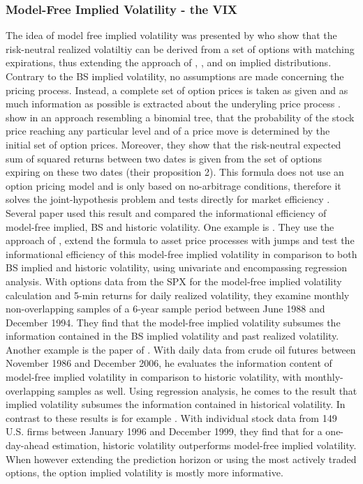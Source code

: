 \subsubsection{Model-Free Implied Volatility - the VIX}\label{sec:223VIX}
The idea of model free implied volatility was presented by \textcite{britten2000} who show that the risk-neutral realized volatiltiy can be derived from a set of options with matching expirations, thus extending the approach of \textcite{derman1994}, \textcite{dupire1994}, \textcite{dupire1997} and \textcite{rubinstein1994} on implied distributions. Contrary to the \ac{BS} implied volatility, no assumptions are made concerning the pricing process. Instead, a complete set of option prices is taken as given and as much information as possible is extracted about the underyling price process \parencite{britten2000}. \\
\textcite{britten2000} show in an approach resembling a binomial tree, that the probability of the stock price reaching any particular level and of a price move is determined by the initial set of option prices. Moreover, they show that the risk-neutral expected sum of squared returns between two dates is given from the set of options expiring on these two dates (their proposition 2). This formula does not use an option pricing model and is only based on no-arbitrage conditions, therefore it solves the joint-hypothesis problem and tests directly for market efficiency \parencite{jiang2003}. \\
Several paper used this result and compared the informational efficiency of model-free implied, \ac{BS} and historic volatility. One example is \textcite{jiang2003}. They use the approach of \textcite{britten2000}, extend the formula to asset price processes with jumps and test the informational efficiency of this model-free implied volatility in comparison to both \ac{BS} implied and historic volatility, using univariate and encompassing regression analysis. With options data from the \ac{SPX} for the model-free implied volatility calculation and 5-min returns for daily realized volatility, they examine monthly non-overlapping samples of a 6-year sample period between June 1988 and December 1994. They find that the model-free implied volatility subsumes the information contained in the \ac{BS} implied volatility and past realized volatility. Another example is the paper of \textcite{bakanova2010}. With daily data from crude oil futures between November 1986 and December 2006, he evaluates the information content of model-free implied volatility in comparison to historic volatility, with monthly-overlapping samples as well. Using regression analysis, he comes to the result that implied volatility subsumes the information contained in historical volatility. In contrast to these results is for example \textcite{taylor2010}. With individual stock data from 149 U.S. firms between January 1996 and December 1999, they find that for a one-day-ahead estimation, historic volatility outperforms model-free implied volatility. When however extending the prediction horizon or using the most actively traded options, the option implied volatility is mostly more informative. \\
